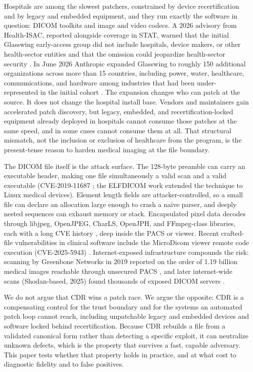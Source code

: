 \documentclass[11pt]{article}
\begin{document}
Hospitals are among the slowest patchers, constrained by device recertification and by legacy and embedded equipment, and they run exactly the software in question: DICOM toolkits and image and video codecs. A 2026 advisory from Health-ISAC, reported alongside coverage in STAT, warned that the initial Glasswing early-access group did not include hospitals, device makers, or other health-sector entities and that the omission could jeopardize health-sector security \cite{ref4,ref5}. In June 2026 Anthropic expanded Glasswing to roughly 150 additional organizations across more than 15 countries, including power, water, healthcare, communications, and hardware among industries that had been under-represented in the initial cohort \cite{ref25}. The expansion changes who can patch at the source. It does not change the hospital install base. Vendors and maintainers gain accelerated patch discovery, but legacy, embedded, and recertification-locked equipment already deployed in hospitals cannot consume those patches at the same speed, and in some cases cannot consume them at all. That structural mismatch, not the inclusion or exclusion of healthcare from the program, is the present-tense reason to harden medical imaging at the file boundary.

The DICOM file itself is the attack surface. The 128-byte preamble can carry an executable header, making one file simultaneously a valid scan and a valid executable (CVE-2019-11687 \cite{ref6}; the ELFDICOM work \cite{ref7} extended the technique to Linux medical devices). Element length fields are attacker-controlled, so a small file can declare an allocation large enough to crash a naive parser, and deeply nested sequences can exhaust memory or stack. Encapsulated pixel data decodes through libjpeg, OpenJPEG, CharLS, OpenJPH, and FFmpeg-class libraries, each with a long CVE history \cite{ref10}, deep inside the PACS or viewer. Recent crafted-file vulnerabilities in clinical software include the MicroDicom viewer remote code execution (CVE-2025-5943) \cite{ref9}. Internet-exposed infrastructure compounds the risk: scanning by Greenbone Networks in 2019 reported on the order of 1.19 billion medical images reachable through unsecured PACS \cite{ref11}, and later internet-wide scans (Shodan-based, 2025) found thousands of exposed DICOM servers \cite{ref12}.

We do not argue that CDR wins a patch race. We argue the opposite: CDR is a compensating control for the trust boundary and for the systems an automated patch loop cannot reach, including unpatchable legacy and embedded devices and software locked behind recertification. Because CDR rebuilds a file from a validated canonical form rather than detecting a specific exploit, it can neutralize unknown defects, which is the property that survives a fast, capable adversary. This paper tests whether that property holds in practice, and at what cost to diagnostic fidelity and to false positives.
\end{document}

